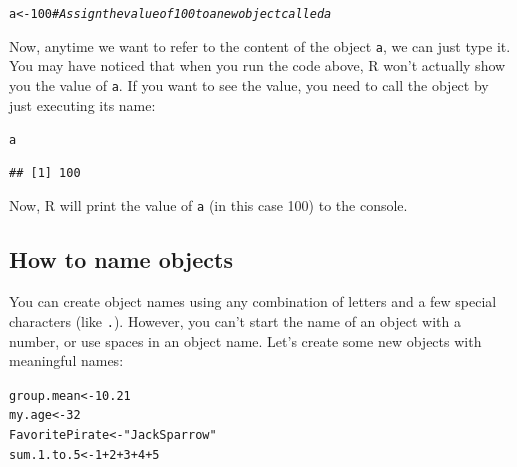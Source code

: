 \documentclass{tufte-book}\usepackage[]{graphicx}\usepackage[]{color}
\makeatletter
\newcommand{\hlnum}[1]{\textcolor[rgb]{0.686,0.059,0.569}{#1}}%
\newcommand{\hlstr}[1]{\textcolor[rgb]{0.192,0.494,0.8}{#1}}%
\newcommand{\hlcom}[1]{\textcolor[rgb]{0.678,0.584,0.686}{\textit{#1}}}%
\newcommand{\hlopt}[1]{\textcolor[rgb]{0,0,0}{#1}}%
\newcommand{\hlstd}[1]{\textcolor[rgb]{0.345,0.345,0.345}{#1}}%
\newcommand{\hlkwb}[1]{\textcolor[rgb]{0.69,0.353,0.396}{#1}}%
\newenvironment{kframe}{%
 \def\at@end@of@kframe{}%
 \ifinner\ifhmode%
  \def\at@end@of@kframe{\end{minipage}}%
  \begin{minipage}{\columnwidth}%
 \fi\fi%
 \def\FrameCommand##1{\hskip\@totalleftmargin \hskip-\fboxsep
 \colorbox{shadecolor}{##1}\hskip-\fboxsep
     \hskip-\linewidth \hskip-\@totalleftmargin \hskip\columnwidth}%
 \MakeFramed {\advance\hsize-\width
   \@totalleftmargin\z@ \linewidth\hsize
   \@setminipage}}%
 {\par\unskip\endMakeFramed%
 \at@end@of@kframe}
\newenvironment{knitrout}{}{} %
\makeatother
\begin{document}
\begin{knitrout}
\color{fgcolor}\begin{kframe}
\begin{alltt}
\hlstd{a} \hlkwb{<-} \hlnum{100} \hlcom{# Assign the value of 100 to a new object called a}
\end{alltt}
\end{kframe}
\end{knitrout}

Now, anytime we want to refer to the content of the object \texttt{a}, we can just type it. You may have noticed that when you run the code above, R won't actually show you the value of \texttt{a}. If you want to see the value, you need to call the object by just executing its name:

\begin{knitrout}
\color{fgcolor}\begin{kframe}
\begin{alltt}
\hlstd{a}
\end{alltt}
\begin{verbatim}
## [1] 100
\end{verbatim}
\end{kframe}
\end{knitrout}

Now, R will print the value of \texttt{a} (in this case 100) to the console.


\subsection{How to name objects}

You can create object names using any combination of letters and a few special characters (like \texttt{.}). However, you can't start the name of an object with a number, or use spaces in an object name. Let's create some new objects with meaningful names:

\begin{knitrout}
\color{fgcolor}\begin{kframe}
\begin{alltt}
\hlstd{group.mean} \hlkwb{<-} \hlnum{10.21}
\hlstd{my.age} \hlkwb{<-} \hlnum{32}
\hlstd{FavoritePirate} \hlkwb{<-} \hlstr{"Jack Sparrow"}
\hlstd{sum.1.to.5} \hlkwb{<-} \hlnum{1} \hlopt{+} \hlnum{2} \hlopt{+} \hlnum{3} \hlopt{+} \hlnum{4} \hlopt{+} \hlnum{5}
\end{alltt}
\end{kframe}
\end{knitrout}
\end{document}
